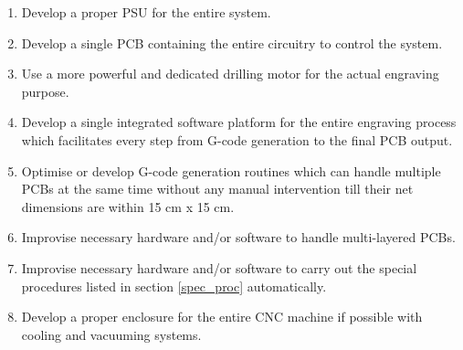\begin{enumerate}
 \item Develop a proper PSU for the entire system.
 \item Develop a single PCB containing the entire circuitry to control the system.
 \item Use a more powerful and dedicated drilling motor for the actual engraving purpose.
 \item Develop a single integrated software platform for the entire engraving process which facilitates every step from G-code generation to the final PCB output.
 \item Optimise or develop G-code generation routines which can handle multiple PCBs at the same time without any manual intervention till their net dimensions are within 15 cm x 15 cm.
 \item Improvise necessary hardware and/or software to handle multi-layered PCBs.
 \item Improvise necessary hardware and/or software to carry out the special procedures listed in section \ref{spec_proc} automatically.
 \item Develop a proper enclosure for the entire CNC machine if possible with cooling and vacuuming systems.
\end{enumerate}

